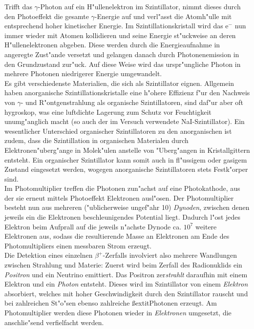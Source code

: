 \documentclass{article}
\begin{document}
Trifft das $\gamma$-Photon auf ein H"ullenelektron im Szintillator, nimmt dieses durch den Photoeffekt die gesamte $\gamma$-Energie auf und verl"asst die Atomh"ulle mit entsprechend hoher kinetischer Energie. Im Szintillationskristall wird das e$^-$ nun immer wieder mit Atomen kollidieren und seine Energie st"uckweise an deren H"ullenelektronen abgeben. Diese werden durch die Energieaufnahme in angeregte Zust"ande versetzt und gelangen danach durch Photonenemission in den Grundzustand zur"uck. Auf diese Weise wird das urspr"ungliche Photon in mehrere Photonen niedrigerer Energie umgewandelt.\\
Es gibt verschiedenste Materialien, die sich als Szintillator eignen. Allgemein haben anorganische Szintillationskristalle eine h"ohere Effizienz f"ur den Nachweis von $\gamma$- und R"ontgenstrahlung als organische Szintillatoren, sind daf"ur aber oft hygroskop, was eine luftdichte Lagerung zum Schutz vor Feuchtigkeit unumg"anglich macht (so auch der im Versuch verwendete NaI-Szintillator). Ein wesentlicher Unterschied organischer Szintillatoren zu den anorganischen ist zudem, dass die Szintillation in organischen Materialen durch Elektronen"uberg"ange in Molek"ulen anstelle von "Uberg"angen in Kristallgittern entsteht. Ein organischer Szintillator kann somit auch in fl"ussigem oder gasigem Zustand eingesetzt werden, wogegen anorganische Szintillatoren stets Festk"orper sind.\\
Im Photomultiplier treffen die Photonen zun"achst auf eine Photokathode, aus der sie erneut mittels Photoeffekt Elektronen ausl"osen.
Der Photomultiplier besteht nun aus mehreren ("ublicherweise ungef"ahr 10) \textit{Dynoden}, zwischen denen jeweils ein die Elektronen beschleunigendes Potential liegt. Dadurch l"ost jedes Elektron beim Aufprall auf die jeweils n"achste Dynode ca. $10^7$ weitere Elektronen aus, sodass die resultierende Masse an Elektronen am Ende des Photomultipliers einen messbaren Strom erzeugt.\\
Die Detektion eines einzelnen $\beta^+$-Zerfalls involviert also mehrere Wandlungen zwischen Strahlung und Materie: Zuerst wird beim Zerfall des Radionuklids ein \textit{Positron} und ein Neutrino emittiert. Das Positron zer\textit{strahlt} daraufhin mit einem Elektron und ein \textit{Photon} entsteht. Dieses wird im Szintillator von einem \textit{Elektron} absorbiert, welches mit hoher Geschwindigkeit durch den Szintillator rauscht und bei zahlreichen St"o"sen ebenso zahlreiche ßextit{Photonen} erzeugt. Am Photomultiplier werden diese Photonen wieder in \textit{Elektronen} umgesetzt, die anschlie"send verfielfacht werden.
\end{document}
